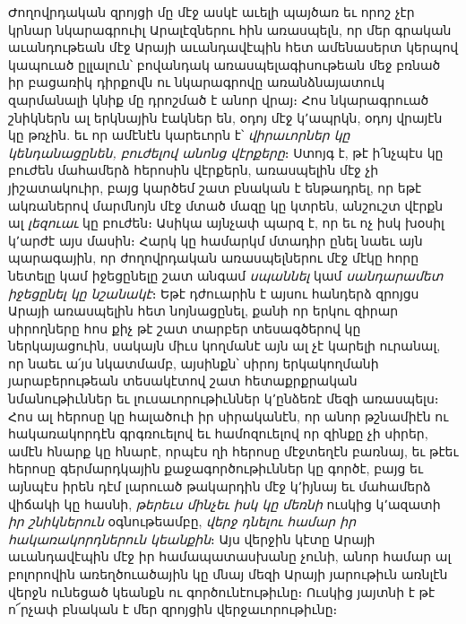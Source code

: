 \documentclass{article}
\begin{document}
{Ժողովրդական զրոյցի մը մէջ ասկէ աւելի պայծառ եւ որոշ չէր կրնար նկարագրուիլ Արալէզներու հին առասպելն, որ մեր գրական աւանդութեան մէջ Արայի աւանդավէպին հետ ամենասերտ կերպով կապուած ըլլալուն՝ բովանդակ առասպելագիսութեան մեջ բռնած իր բացառիկ դիրքովն ու նկարագրովը առանձնայատուկ զարմանալի կնիք մը դրոշմած է անոր վրայ։ Հոս նկարագրուած շնիկներն ալ երկնային էակներ են, օդոյ մէջ կ՚ապրկն, օդոյ վրայէն կը թռչին. եւ որ ամէնէն կարեւորն է՝ \emph{վիրաւորներ կը կենդանացընեն, բուժելով անոնց վէրքերը}։ Ստոյգ է, թէ ի՛նչպէս կը բուժեն մահամերձ հերոսին վէրքերն, առասպելին մէջ չի յիշատակուիր, բայց կարծեմ շատ բնական է ենթադրել, որ եթէ ակռաներով մարմնոյն մէջ մտած մազը կը կտրեն, անշուշտ վէրքն ալ \emph{լեզուաւ} կը բուժեն։ Ասիկա այնչափ պարզ է, որ եւ ոչ իսկ խօսիլ կ՚արժէ այս մասին։ Հարկ կը համարկմ մտադիր ընել նաեւ այն պարագային, որ ժողովրդական առասպելներու մէջ մէկը հորը նետելը կամ իջեցընելը շատ անգամ \emph{սպաննել} կամ \emph{սանդարամետ իջեցընել կը նշանակէ}։ Եթէ դժուարին է այսու հանդերձ զրոյցս Արայի առասպելին հետ նոյնացընել, քանի որ երկու զիրար սիրողները հոս քիչ թէ շատ տարբեր տեսագծերով կը ներկայացուին, սակայն միւս կողմանէ այն ալ չէ կարելի ուրանալ, որ նաեւ ա՛յս նկատմամբ, այսինքն՝ սիրոյ երկակողմանի յարաբերութեան տեսակէտով շատ հետաքրքրական նմանութիւններ եւ լուսաւորութիւններ կ՚ընձեռէ մեզի առասպելս։ Հոս ալ հերոսը կը հալածուի իր սիրականէն, որ անոր թշնամիէն ու հակառակորդէն գրգռուելով եւ համոզուելով որ զինքը չի սիրեր, ամէն հնարք կը հնարէ, որպէս ղի հերոսը մէջտեղէն բառնայ, եւ թէեւ հերոսը գերմարդկային քաջագործութիւններ կը գործէ, բայց եւ այնպէս իրեն դէմ լարուած թակարդին մէջ կ՚իյնայ եւ մահամերձ վիճակի կը հասնի, \emph{թերեւս մինչեւ իսկ կը մեռնի} ուսկից կ՚ազատի \emph{իր շնիկներուն} օգնութեամբը, \emph{վերջ դնելու համար իր հակառակորդներուն կեանքին}։ Այս վերջին կէտը Արայի աւանդավէպին մէջ իր համապատասխանը չունի, անոր համար ալ բոլորովին առեղծուածային կը մնայ մեզի Արայի յարութիւն առնլէն վերջն ունեցած կեանքն ու գործունէութիւնը։ Ուսկից յայտնի է թէ ո՜րչափ բնական է մեր զրոյցին վերջաւորութիւնը։

}
\end{document}
